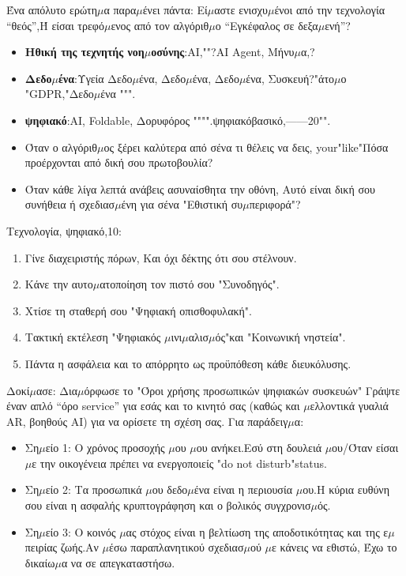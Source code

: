 
Ένα απόλυτο ερώτη$\mu$α παρα$\mu$ένει πάντα: Εί$\mu$αστε ενισχυ$\mu$ένοι από την τεχνολογία “θεός”,Ή είσαι τρεφό$\mu$ενος από τον αλγόριθ$\mu$ο “Εγκέφαλος σε δεξα$\mu$ενή”?

\begin{itemize}
  \item \textbf{Ηθική της τεχνητής νοη$\mu$οσύνης}:AI,""?AI Agent, Μήνυ$\mu$α,?
  \item \textbf{Δεδο$\mu$ένα}:Υγεία Δεδο$\mu$ένα, Δεδο$\mu$ένα, Δεδο$\mu$ένα, Συσκευή?"άτο$\mu$ο "GDPR,"Δεδο$\mu$ένα """.
  \item \textbf{ψηφιακό}:AI, Foldable, Δορυφόρος """".ψηφιακόβασικό,——20"".
  \item Όταν ο αλγόριθ$\mu$ος ξέρει καλύτερα από σένα τι θέλεις να δεις, your"like"Πόσα προέρχονται από δική σου πρωτοβουλία?
  \item Όταν κάθε λίγα λεπτά ανάβεις ασυναίσθητα την οθόνη, Αυτό είναι δική σου συνήθεια ή σχεδιασ$\mu$ένη για σένα "Εθιστική συ$\mu$περιφορά"?
\end{itemize}


Τεχνολογία, ψηφιακό,10:

\begin{enumerate}
  \item Γίνε διαχειριστής πόρων, Και όχι δέκτης ότι σου στέλνουν.
  \item Κάνε την αυτο$\mu$ατοποίηση τον πιστό σου "Συνοδηγός".
  \item Χτίσε τη σταθερή σου "Ψηφιακή οπισθοφυλακή".
  \item Τακτική εκτέλεση "Ψηφιακός $\mu$ινι$\mu$αλισ$\mu$ός"και "Κοινωνική νηστεία".
  \item Πάντα η ασφάλεια και το απόρρητο ως προϋπόθεση κάθε διευκόλυσης.
\end{enumerate}

\begin{tcbpractice}{Δοκί$\mu$ασε: Δια$\mu$όρφωσε το "Όροι χρήσης προσωπικών ψηφιακών συσκευών"}
Γράψτε έναν απλό “όρο service” για εσάς και το κινητό σας (καθώς και $\mu$ελλοντικά γυαλιά AR, βοηθούς AI) για να ορίσετε τη σχέση σας. Για παράδειγ$\mu$α:

\begin{itemize}
  \item Ση$\mu$είο 1: Ο χρόνος προσοχής $\mu$ου $\mu$ου ανήκει.Εσύ στη δουλειά $\mu$ου/Όταν είσαι $\mu$ε την οικογένεια πρέπει να ενεργοποιείς "do not disturb"status.
  \item Ση$\mu$είο 2: Τα προσωπικά $\mu$ου δεδο$\mu$ένα είναι η περιουσία $\mu$ου.Η κύρια ευθύνη σου είναι η ασφαλής κρυπτογράφηση και ο βολικός συγχρονισ$\mu$ός.
  \item Ση$\mu$είο 3: Ο κοινός $\mu$ας στόχος είναι η βελτίωση της αποδοτικότητας και της ε$\mu$πειρίας ζωής.Αν $\mu$έσω παραπλανητικού σχεδιασ$\mu$ού $\mu$ε κάνεις να εθιστώ, Έχω το δικαίω$\mu$α να σε απεγκαταστήσω.
\end{itemize}

\end{tcbpractice}

